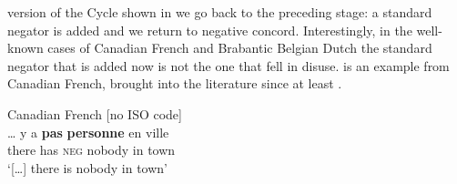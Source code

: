 ﻿\documentclass[output=paper]{langsci/langscibook}
\begin{document}
version of the Cycle shown in  we go back to the
preceding stage: a standard negator is added and we return to negative
concord.  Interestingly, in the well-known cases of Canadian French and
Brabantic Belgian Dutch \parencite[e.g.][499]{AuweraAlsenoy2016} the
standard negator that is added now is not the one that fell in disuse.
 is an example from Canadian French, brought into
the literature since at least \citet[262--263]{Muller1991}.
%
\begin{exe}\ex\label{ex:int-canadian-town}
Canadian French [no ISO code] 
\\
    \gll \ldots{} y a \textbf{pas} \textbf{personne} en ville \\
    {} there  has  \textsc{neg}  nobody    in  town \\
    \glt `[…] there is nobody in town'
    \end{exe} 
\end{document}

